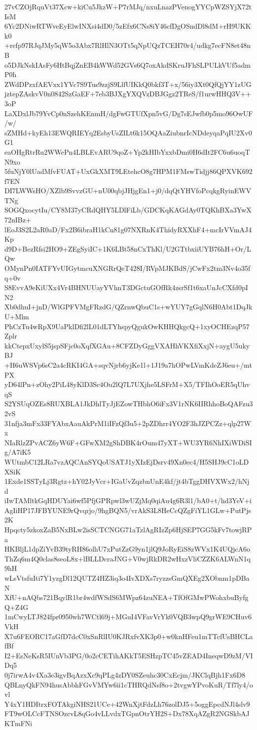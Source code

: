 27vCZOjRquVt37Xcw+kiCu5JkzW+P7rMJq/nxuLnazPVenogYYCpWZSYjX72tIsM
6Yc2DNiwRTWveEyElwINXsi4dD0/5zEfx6CNs8iY46cfDgOSndDl8dM+rH9UKKk0
+rcfp97RJqJMy5qW5o3Abx7RlHlN3OTt5qNpUQzTCEH70r4/udkg7ecFN8et48nB
o5DJkNskIAsFy6HtBqjZnEB4kWWd52GVs6Q7oxAkdSKruJFhSLPULkVUf5admP0h
ZWdDPzxfAEVxx1YVc7S9Tus9zzjS9LlfUIKkQ0bkf3T+x/56iy3Xt0QfQjYY1zUG
jztepZAskvV0n0842SzGaEF+7eb3BJXgYXQVzDBJGgz2TReS/f1urwHHQ3V++3oP
LaXDxlJb79YvCp0nSzehKEnmH/dgFwGTUfXpn5vG/Dg7sEJwfb0p5mo96OwUF/w/
sZMHd+kyEh13EWQRIEYq2EsbyUsZILt6k15OQAaZiubnrIcNDdeyqaPqIU2Xv0G1
eaOHgRtrRu2WWePn4LBLEvARU9qoZ+Yp2kHIbYxxbDmi0H6dIt2FC6u6uoqTN9xo
5fuNjY0lUadMfvFUAT+UxGkXMT9LEtehcO8g7HPM1FMswTidjj86QPXVK692f7EN
DI7LWWsHO/XZlb9SvvzGU+nU00qbjJHjgEn1+j0/dqQtYHVfoPcqkgRyinEWVTNg
SOGQxocytIu/CY8M37yCRdQHY5LDlFiLb/GDCKqKAGdAy0TQKhBXa3YwX72nIBz+
lEoJ3S2L2aR0aD/Fx2B6ibraH1kCn81g07NXRnK4ThidyRXXhF4+mcIrVVmAJ4Kp
d9D+BezRfsi2HO9+ZEgSyiIC+1K6LBt58nCxThKl/U2GTtbxiiUYB76hH+Or/LQw
OMynPn0IATFYvUIGytmcuXNGRrQeT428I/RVpMJKBdS/jCwFx2tm3Nv4o35fq+0v
S8EvvA9eKiUXx4Vr4BHNUUayYVhnT3DGctuGOfRk4zsrSf1t6xaUnJcCXfd0pIN2
Xb0dhuI+jnD/WlGPFVMgFRzdG/QZrnwQbuC1s+wYUY7gGqlN6H0Abt1DqJkU+Mlm
PhCzTu4wRpX9UaPklDfi2lL01dLTYhspyQgukOwKHHQkgcQ+1xyOCHEzqP57Zplr
kkCtepxUxylS5jspSFjc0oXqfXGAu+8CFZDyGggVXAHhVKXfiXxjN+aygU5ukyBJ
+H6uWSVp6sC2a4cRKI4GA+sqvNjrb6yjKe1l+1J19a7hOPwLVmKdeZJ6eu+/mtPX
yD64lPn+zOhy2PiL48yKlD3Sc4Ou2lQ7L7UXjhe5LSFrM+X5/TFIhOoER5qUhvqS
S2YSUqOZEs8RUXBLA1JkDhlTyJjEZowTHbhO6iFx3V1rNK6IIRhhoBoQAFzu32vS
31nfja3mFx33FYAbxAauAkPrM1iIFzQf3u5+2pZDhrr4YO2F3hJZPCZz+qlp27Wx
NIaRlzZPvACZ6yW6F+GFwXM2gShDBK4rOum47yXT+WU3YR6NhIXiWDiSIg/A7iK5
WUtmbC12LRa7vzAQCAnSYQoUSATJ1yXIzEjDsrv49Xn0ec4/H5SHJ9cC1oLDXSiK
1Exde1SSTyLj3Rgtz+hY02JyVcr+IGaUvZqzbnUnE4kf/jt4bTggDHVXWx2/hNjd
iIwTAMltkGqHDUYai6wf5PfjGPRpwl3wUZjMq0qiAu4g6R3l1/bA0+t/hd3YeV+i
AgIiHP17JFBYUNE9rQvqrjo/9hgBQN5/vrAkS3L8HeCcQZgFiYL1GLw+PutPjs2K
Hpqcty5zkoxZaB5NxBLw2isSCTCNGG71aTzlAgRIzZp6HjSEP7GG5kFv7towjRPa
HKBljL1dpZiYvB39tyRH86olhU7xPutZzG9yn1jlQ9JoRyEiS8zWVx1K4UQjcA6o
ThZq6m4Q0clas8seoL8x+lBLLDcraJNG+V0wjRkDR2wHxzVliCZZK6ALWnN1q9hH
wLsVtsfuIti7Y1yzgDl12QUTZ4HZ3iq3o4IvXDXs7ryzzsGmQXEg2XObnm1pDBaN
XfU+nAQbs721BqylR1br4wdfWSdS6MWpz64zuNEA+TfOfGMwPWohxbuByfgQ+Z4G
1mCwyLTJ824fpr0950wh7WCtl69j+MGuI4VFavVrYk0VQB3wpQ9grWE9CHuv6VkH
X7u6FEORC17aGfD7dcC0xSnRlIU0KJRxfvXK3p0+w0knHFeu1mTTcfUsBHCLafBf
I2+EsNeKsR5IUnVb3PG/0o2cCETihAKkT5ESHzpTC45vZEAD4IneqwD9zM/VIDq5
0j7irwA4v4Xa3e3igvBqAzxXc9qPLg4zDY0SZeuhc30CxEcjm/JKClqBjh1Fx6D8
QBLnyQkFN94husAbbhFGvVMYw6ii1cTHRQdNsf8o+2tvgwYPvoKuR/Tf7ly4/ovl
Y4xY1HDItrxFOTAkgiNHS21UCe+42WnXjtFdzLh76zolDJ5+5oggEpcdNJl4slv9
FT9wOLCcFTNSOzcvL8qGo4vLLvdxTGpnOtrYH2S+Dx78XqAZgR2NGSkbAJKTmFNi
